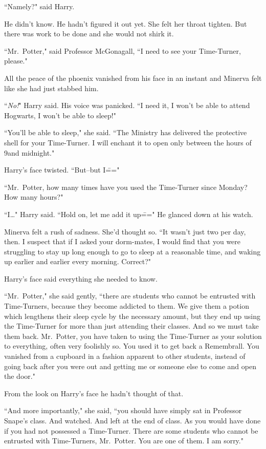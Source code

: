 ``Namely?" said Harry.

He didn't know. He hadn't figured it out yet. She felt her throat tighten. But there was work to be done and she would not shirk it.

``Mr.~Potter," said Professor McGonagall, ``I need to see your Time-Turner, please."

All the peace of the phoenix vanished from his face in an instant and Minerva felt like she had just stabbed him.

``\emph{No!}" Harry said. His voice was panicked. ``I need it, I won't be able to attend Hogwarts, I won't be able to sleep!"

``You'll be able to sleep," she said. ``The Ministry has delivered the protective shell for your Time-Turner. I will enchant it to open only between the hours of 9\pm and midnight."

Harry's face twisted. ``But\---but I\==="

``Mr.~Potter, how many times have you used the Time-Turner since Monday? How many hours?"

``I{\ldots}" Harry said. ``Hold on, let me add it up\===" He glanced down at his watch.

Minerva felt a rush of sadness. She'd thought so. ``It wasn't just two per day, then. I suspect that if I asked your dorm-mates, I would find that you were struggling to stay up long enough to go to sleep at a reasonable time, and waking up earlier and earlier every morning. Correct?"

Harry's face said everything she needed to know.

``Mr.~Potter," she said gently, ``there are students who cannot be entrusted with Time-Turners, because they become addicted to them. We give them a potion which lengthens their sleep cycle by the necessary amount, but they end up using the Time-Turner for more than just attending their classes. And so we must take them back. Mr.~Potter, you have taken to using the Time-Turner as your solution to everything, often very foolishly so. You used it to get back a Remembrall. You vanished from a cupboard in a fashion apparent to other students, instead of going back after you were out and getting me or someone else to come and open the door."

From the look on Harry's face he hadn't thought of that.

``And more importantly," she said, ``you should have simply sat in Professor Snape's class. And watched. And left at the end of class. As you would have done if you had not possessed a Time-Turner. There are some students who cannot be entrusted with Time-Turners, Mr.~Potter. You are one of them. I am sorry."

